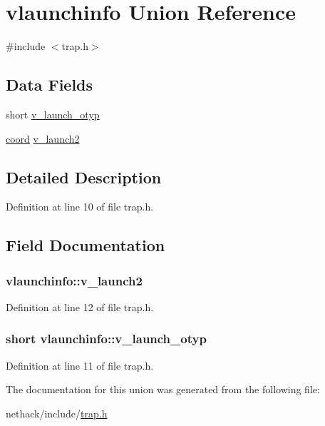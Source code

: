 \hypertarget{unionvlaunchinfo}{\section{vlaunchinfo Union Reference}
\label{unionvlaunchinfo}
}


{\ttfamily \#include $<$trap.\+h$>$}

\subsection*{Data Fields}
\begin{DoxyCompactItemize}
\item 
short \hyperlink{unionvlaunchinfo_a651f5d49c7d5b34471420c833e6dc0a8}{v\+\_\+launch\+\_\+otyp}
\item 
\hyperlink{structcoord}{coord} \hyperlink{unionvlaunchinfo_a010358ce21dfdc1531ebdc7578394e87}{v\+\_\+launch2}
\end{DoxyCompactItemize}


\subsection{Detailed Description}


Definition at line 10 of file trap.\+h.



\subsection{Field Documentation}
\hypertarget{unionvlaunchinfo_a010358ce21dfdc1531ebdc7578394e87}{
\subsubsection[{v\+\_\+launch2}]{ vlaunchinfo\+::v\+\_\+launch2}}\label{unionvlaunchinfo_a010358ce21dfdc1531ebdc7578394e87}


Definition at line 12 of file trap.\+h.

\hypertarget{unionvlaunchinfo_a651f5d49c7d5b34471420c833e6dc0a8}{
\subsubsection[{v\+\_\+launch\+\_\+otyp}]{\setlength{\rightskip}{0pt plus 5cm}short vlaunchinfo\+::v\+\_\+launch\+\_\+otyp}}\label{unionvlaunchinfo_a651f5d49c7d5b34471420c833e6dc0a8}


Definition at line 11 of file trap.\+h.



The documentation for this union was generated from the following file\+:\begin{DoxyCompactItemize}
\item 
nethack/include/\hyperlink{trap_8h}{trap.\+h}\end{DoxyCompactItemize}
